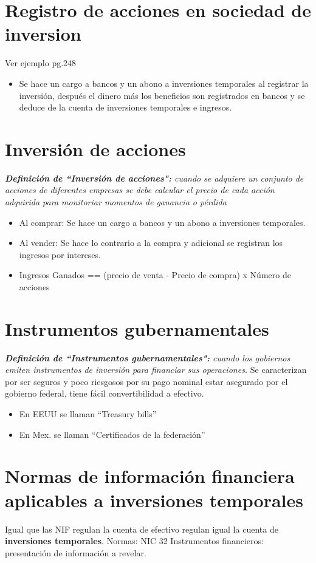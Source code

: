 \documentclass{article}
\begin{document}
\section{Registro de acciones en sociedad de inversion}
Ver ejemplo pg.248
\begin{itemize}
    \item Se hace un cargo a bancos y un abono a inversiones temporales al registrar la inversión, después el dinero más los beneficios son registrados en bancos y se deduce de la cuenta de inversiones temporales e ingresos.
\end{itemize}

\section{Inversión de acciones}
\emph{\textbf{Definición de ``Inversión de acciones":} cuando se adquiere un conjunto de acciones de diferentes empresas se debe calcular el precio de cada acción adquirida para monitoriar momentos de ganancia o pérdida}
\begin{itemize}
    \item Al comprar: Se hace un cargo a bancos y un abono a inversiones temporales.
    \item Al vender: Se hace lo contrario a la compra y adicional se registran los ingresos por intereses.
    \item Ingresos Ganados == (precio de venta - Precio de compra) x Número de acciones
\end{itemize}

\section{Instrumentos gubernamentales}
\emph{\textbf{Definición de ``Instrumentos gubernamentales":}  cuando los gobiernos emiten instrumentos de inversión para financiar sus operaciones.} \newline 
Se caracterizan por ser seguros y poco riesgosos por su pago nominal estar asegurado por el gobierno federal, tiene fácil convertibilidad a efectivo.
\begin{itemize}
    \item En EEUU se llaman ``Treasury bills''
    \item En Mex. se llaman ``Certificados de la federación''
\end{itemize}

\section{Normas de información financiera aplicables a inversiones temporales}
Igual que las NIF regulan la cuenta de efectivo regulan igual la cuenta de \textbf{inversiones temporales}.\newline 
\newline 
Normas: 
NIC 32 Instrumentos financieros: presentación de información a revelar.
\end{document}
